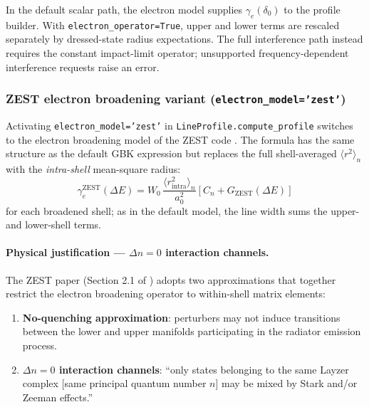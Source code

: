 \documentclass[11pt,a4paper]{article}
\numberwithin{equation}{section}
\begin{document}
In the default scalar path, the electron model supplies $\gamma_e(\delta_0)$ to the profile builder. With \texttt{electron\_operator=True}, upper and lower terms are rescaled separately by dressed-state radius expectations. The full interference path instead requires the constant impact-limit operator; unsupported frequency-dependent interference requests raise an error.

\subsubsection{ZEST electron broadening variant (\texttt{electron\_model='zest'})}
\label{sec:zest_electron}

Activating \texttt{electron\_model='zest'} in \texttt{LineProfile.compute\_profile}
switches to the electron broadening model of the ZEST code \cite{Gilleron2018}.
The formula has the same structure as the default GBK expression but replaces the
full shell-averaged $\langle r^2 \rangle_n$ with the \emph{intra-shell} mean-square
radius:
\begin{equation}
\gamma_e^\text{ZEST}(\Delta E) = W_0\,\frac{\langle r^2_\mathrm{intra} \rangle_n}{a_0^2}
\left[ C_n + G_\mathrm{ZEST}(\Delta E) \right]
\end{equation}
for each broadened shell; as in the default model, the line width sums the upper- and lower-shell terms.

\paragraph{Physical justification — $\Delta n = 0$ interaction channels.}
The ZEST paper (Section 2.1 of \cite{Gilleron2018}) adopts two approximations that
together restrict the electron broadening operator to within-shell matrix elements:

\begin{enumerate}
  \item \textbf{No-quenching approximation}: perturbers may not induce transitions
    between the lower and upper manifolds participating in the radiator emission
    process.
  \item \textbf{$\Delta n = 0$ interaction channels}: ``only states belonging to the
    same Layzer complex [same principal quantum number $n$] may be mixed by Stark
    and/or Zeeman effects.''
\end{enumerate}
\end{document}
